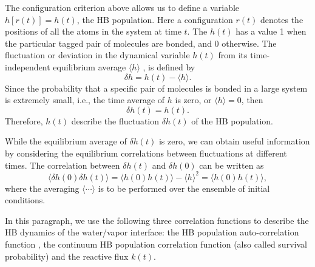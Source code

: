 The configuration criterion above allows us to define a variable $h[r(t)] = h(t)$, the HB population. 
Here a configuration $r(t)$ denotes the positions of all the atoms in the system at time $t$\cite{AL96}.  
The $h(t)$ has a value 1 when the particular tagged pair of molecules are bonded, and 0 otherwise. 
The fluctuation or deviation in the dynamical variable $h(t)$ from its time-independent equilibrium average $\langle h\rangle$ , 
is defined by\cite{DC87} 
$$
\delta h = h(t) - \langle h\rangle.
$$
Since the probability that a specific pair of molecules is bonded in a large system is extremely small, i.e., 
the time average of $h$ is zero, or  
$\langle h \rangle = 0$,
then
$$
\delta h(t) = h(t).
$$
Therefore, $h(t)$ describe the fluctuation $\delta h(t)$  of the HB population.  

While the equilibrium average of $\delta h(t)$ is zero, we can obtain useful information by considering the equilibrium 
correlations between fluctuations at different times. The correlation between $\delta h(t)$ and $\delta h(0)$ can be written as 
$$
\langle \delta h(0) \delta h(t)\rangle = \langle h(0)h(t)\rangle-\langle h \rangle^2 = \langle h(0)h(t)\rangle,
$$
where the averaging $\langle\cdots\rangle$ is to be performed over the ensemble of initial conditions.%


In this paragraph, we use the following three correlation functions to describe the HB dynamics of the water/vapor interface:
the HB population auto-correlation function \CHB, the continuum HB population correlation function (also called survival probability) 
\SHB and the reactive flux $k(t)$\cite{Rapaport1983}.

\FloatBarrier
